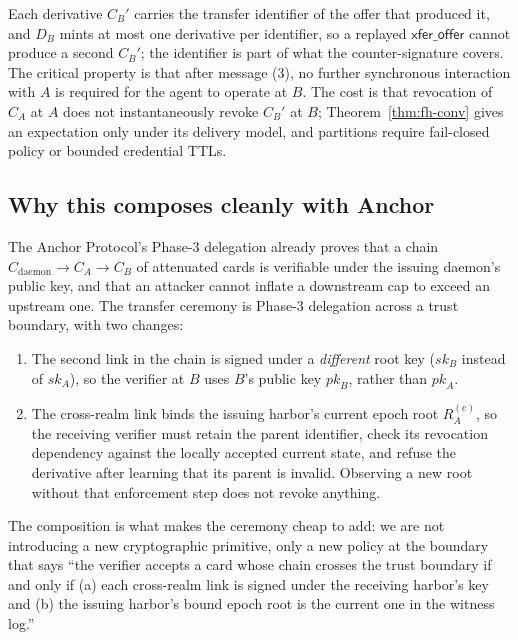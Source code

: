 \documentclass[11pt,a4paper]{article}
\theoremstyle{definition}
\theoremstyle{remark}
\begin{document}
Each derivative $C_B'$ carries the transfer identifier of the offer that produced it, and $D_B$ mints at most one derivative per identifier, so a replayed $\mathsf{xfer\_offer}$ cannot produce a second $C_B'$; the identifier is part of what the counter-signature covers. The critical property is that after message (3), no further synchronous interaction with $A$ is required for the agent to operate at $B$. The cost is that revocation of $C_A$ at $A$ does not instantaneously revoke $C_B'$ at $B$; Theorem~\ref{thm:fh-conv} gives an expectation only under its delivery model, and partitions require fail-closed policy or bounded credential TTLs.

\subsection{Why this composes cleanly with Anchor}\label{sec:fh-xfer-compose}

The Anchor Protocol's Phase-3 delegation already proves that a chain $C_{\text{daemon}} \to C_A \to C_B$ of attenuated cards is verifiable under the issuing daemon's public key, and that an attacker cannot inflate a downstream cap to exceed an upstream one. The transfer ceremony is Phase-3 delegation across a trust boundary, with two changes:

\begin{enumerate}[nosep]
\item The second link in the chain is signed under a \emph{different} root key ($\mathit{sk}_B$ instead of $\mathit{sk}_A$), so the verifier at $B$ uses $B$'s public key $\mathit{pk}_B$, rather than $\mathit{pk}_A$.
\item The cross-realm link binds the issuing harbor's current epoch root $R_A^{(e)}$, so the receiving verifier must retain the parent identifier, check its
revocation dependency against the locally accepted current state, and refuse
the derivative after learning that its parent is invalid. Observing a new
root without that enforcement step does not revoke anything.
\end{enumerate}

The composition is what makes the ceremony cheap to add: we are not introducing a new cryptographic primitive, only a new policy at the boundary that says ``the verifier accepts a card whose chain crosses the trust boundary if and only if (a) each cross-realm link is signed under the receiving harbor's key and (b) the issuing harbor's bound epoch root is the current one in the witness log.''
\end{document}
